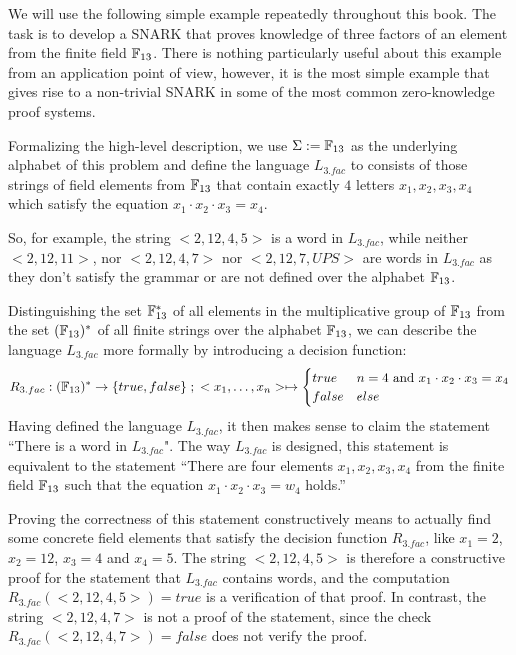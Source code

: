 \begin{example}[3-Factorization]\label{ex:3-factorization} We will use the following simple example repeatedly throughout this book. The task is to develop a SNARK that proves knowledge of three factors of an element from the finite field $\mathbb{F}_{13}$. There is nothing particularly useful about this example from an application point of view, however, it is the most simple example that gives rise to a non-trivial SNARK in some of the most common zero-knowledge proof systems. 

Formalizing the high-level description, we use $\Sigma := \mathbb{F}_{13}$ as the underlying alphabet of this problem and define the language $L_{3.fac}$ to consists of those strings of field elements from $\mathbb{F}_{13}$ that contain exactly $4$ letters $x_1,x_2,x_3,x_4$ which satisfy the equation $x_1\cdot x_2\cdot x_3 =x_4$.

So, for example, the string $<2, 12, 4, 5>$ is a word in $L_{3.fac}$, while neither $<2, 12, 11>$, nor $<2, 12, 4, 7>$ nor $<2, 12, 7, UPS>$ are words in $L_{3.fac}$ as they don't satisfy the grammar or are not defined over the alphabet $\mathbb{F}_{13}$. 

Distinguishing the set $\mathbb{F}_{13}^*$ of all elements in the multiplicative group of $\mathbb{F}_{13}$ from the set $(\mathbb{F}_{13})^*$ of all finite strings over the alphabet $\mathbb{F}_{13}$, we can describe the language $L_{3.fac}$ more formally by introducing a decision function:
\begin{equation}
R_{3.fac} : (\mathbb{F}_{13})^* \to \{true, false\}\;;\;
<x_1,\ldots,x_n> \mapsto
\begin{cases}
true & n=4 \text{ and } x_1\cdot x_2 \cdot x_3 = x_4\\
false & else
\end{cases}
\end{equation}
Having defined the language $L_{3.fac}$, it then makes sense to claim the statement ``There is a word in $L_{3.fac}$". The way $L_{3.fac}$ is designed, this statement is equivalent to the statement ``There are four elements $x_1,x_2,x_3,x_4$ from the finite field $\mathbb{F}_{13}$ such that the equation $x_1\cdot x_2\cdot x_3 =w_4$ holds.''

Proving the correctness of this statement constructively means to actually find some concrete field elements that satisfy the decision function $R_{3.fac}$, like $x_1= 2$, $x_2 =12$, $x_3=4$ and $x_4 = 5$. The string $<2,12,4,5>$ is therefore a constructive proof for the statement that $L_{3.fac}$ contains words, and the computation $R_{3.fac}(<2,12,4,5>)=true$ is a verification of that proof. In contrast, the string $<2, 12, 4, 7>$ is not a proof of the statement, since the check $R_{3.fac}(<2,12,4,7>)=false$ does not verify the proof.
\end{example}
